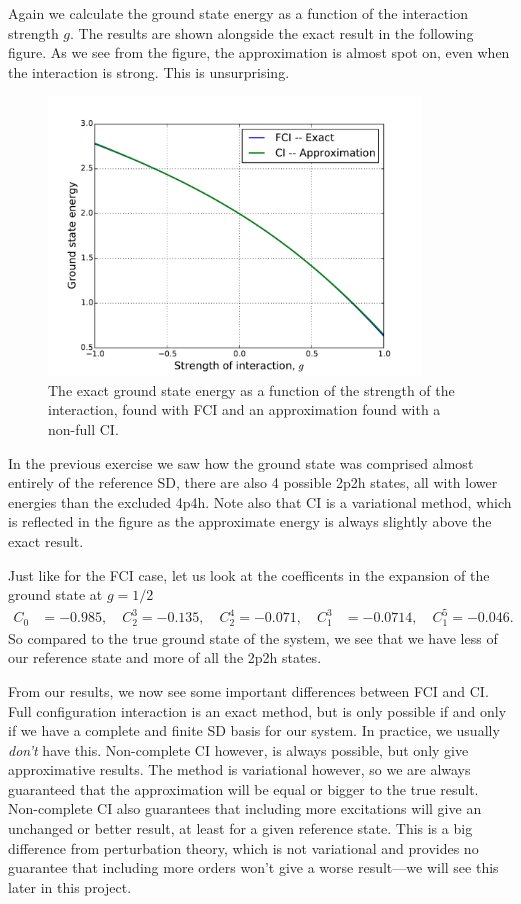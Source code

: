 \documentclass[a4paper, 11pt, notitlepage, english]{article}
\begin{document}
Again we calculate the ground state energy as a function of the interaction strength $g$. The results are shown alongside the exact result in the following figure. As we see from the figure, the approximation is almost spot on, even when the interaction is strong. This is unsurprising. 

\begin{figure}[htpb]
\centering
  \includegraphics[width=0.88\textwidth]{proj1_approx.pdf}
  \caption{The exact ground state energy as a function of the strength of the interaction, found with FCI and an approximation found with a non-full CI. \label{fig:plot2}}
\end{figure}
In the previous exercise we saw how the ground state was comprised almost entirely of the reference SD, there are also 4 possible 2p2h states, all with lower energies than the excluded 4p4h. Note also that CI is a variational method, which is reflected in the figure as the approximate energy is always slightly above the exact result.

Just like for the FCI case, let us look at the coefficents in the expansion of the ground state at $g=1/2$
\begin{align*}
C_0 &= -0.985, \quad C_2^3 = -0.135,  \quad C_2^4 = -0.071, \quad C_1^3 &= -0.0714, \quad C_1^5 = -0.046.
\end{align*}
So compared to the true ground state of the system, we see that we have less of our reference state and more of all the 2p2h states.

From our results, we now see some important differences between FCI and CI. Full configuration interaction is an exact method, but is only possible if and only if we have a complete and finite SD basis for our system. In practice, we usually \emph{don't} have this. Non-complete CI however, is always possible, but only give approximative results. The method is variational however, so we are always guaranteed that the approximation will be equal or bigger to the true result. Non-complete CI also guarantees that including more excitations will give an unchanged or better result, at least for a given reference state. This is a big difference from perturbation theory, which is not variational and provides no guarantee that including more orders won't give a worse result---we will see this later in this project.
\end{document}
